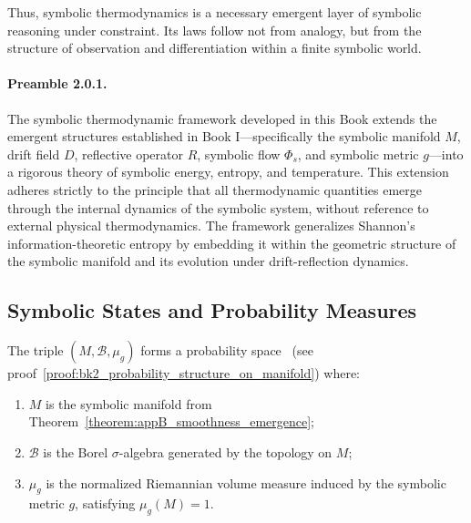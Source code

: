 Thus, symbolic thermodynamics is a necessary emergent layer of symbolic reasoning under constraint. Its laws follow not from analogy, but from the structure of observation and differentiation within a finite symbolic world.

\paragraph{Preamble 2.0.1.} The symbolic thermodynamic framework developed in this Book extends the emergent structures established in Book I—specifically the symbolic manifold $M$, drift field $D$, reflective operator $R$, symbolic flow $\Phi_s$, and symbolic metric $g$—into a rigorous theory of symbolic energy, entropy, and temperature. This extension adheres strictly to the principle that all thermodynamic quantities emerge through the internal dynamics of the symbolic system, without reference to external physical thermodynamics. The framework generalizes Shannon's information-theoretic entropy \cite{shannon1948mathematical} by embedding it within the geometric structure of the symbolic manifold and its evolution under drift-reflection dynamics.

\subsection{Symbolic States and Probability Measures} 
\label{subsec:bk2_symbolic_states_probability_measures}

\begin{definition} 
\label{definition:bk2_symbolic_probability_spa} 
The triple $(M, \mathcal{B}, \mu_g)$ forms a probability space%
~(see proof~\ref{proof:bk2_probability_structure_on_manifold})
where:
\begin{enumerate}
    \item $M$ is the symbolic manifold from Theorem~\ref{theorem:appB_smoothness_emergence};
    \item $\mathcal{B}$ is the Borel $\sigma$-algebra generated by the topology on $M$;
    \item $\mu_g$ is the normalized Riemannian volume measure induced by the symbolic metric $g$, satisfying $\mu_g(M) = 1$.
\end{enumerate}
\end{definition}

